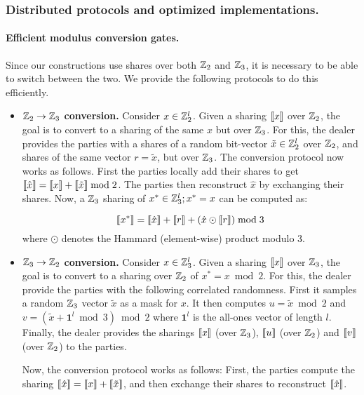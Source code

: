 \subsubsection{Distributed protocols and optimized implementations.}
 
 
\paragraph{Efficient modulus conversion gates.}
Since our constructions use shares over both $\mathbb{Z}_2$ and $\mathbb{Z}_3$, it is necessary to be able to switch between the two. We provide the following protocols to do this efficiently. 

\begin{itemize}
    \item \textbf{$\mathbb{Z}_2 \to \mathbb{Z}_3$ conversion.} Consider $x \in \mathbb{Z}_2^l$. Given a sharing $\left\llbracket x \right\rrbracket$ over $\mathbb{Z}_2$, the goal is to convert to a sharing of the same $x$ but over $\mathbb{Z}_3$. For this, the dealer provides the parties with a shares of a random bit-vector $\tilde{x} \in \mathbb{Z}_2^l$ over $\mathbb{Z}_2$, and shares of the same vector $r = \tilde{x}$, but over $\mathbb{Z}_3$. The conversion protocol now works as follows. First the parties locally add their shares to get $\left\llbracket \hat{x} \right\rrbracket = \left\llbracket x \right\rrbracket + \left\llbracket \tilde{x} \right\rrbracket \bmod 2$. The parties then reconstruct $\hat{x}$ by exchanging their shares. Now, a $\mathbb{Z}_3$ sharing of $x^* \in \mathbb{Z}_3^l; x^* = x$ can be computed as:

    \[
        \left\llbracket x^* \right\rrbracket = \left\llbracket \hat{x} \right\rrbracket + \left\llbracket r \right\rrbracket + (\hat{x} \odot \left\llbracket r \right\rrbracket) \bmod 3
    \]
    where $\odot$ denotes the Hammard (element-wise) product modulo 3.

    \item \textbf{$\mathbb{Z}_3 \to \mathbb{Z}_2$ conversion.}
    Consider $x \in \mathbb{Z}_3^l$. Given a sharing $\left\llbracket x \right\rrbracket$ over $\mathbb{Z}_3$, the goal is to convert to a sharing over $\mathbb{Z}_2$ of $x^* = x \bmod 2$. For this, the dealer provide the parties with the following correlated randomness. First it samples a random $\mathbb{Z}_3$ vector $\tilde{x}$ as a mask for $x$. It then computes $u = \tilde{x} \bmod 2$ and $v = (\tilde{x} + \textbf{1}^l \bmod 3) \bmod 2$ where $\textbf{1}^l$ is the all-ones vector of length $l$. Finally, the dealer provides the sharings $\left\llbracket x \right\rrbracket$ (over $\mathbb{Z}_3$), $\left\llbracket u \right\rrbracket$ (over $\mathbb{Z}_2$) and $\left\llbracket v \right\rrbracket$ (over $\mathbb{Z}_2$) to the parties.

    \hspace*{1em} Now, the conversion protocol works as follows: First, the parties compute the sharing $\left\llbracket \hat{x} \right\rrbracket = \left\llbracket x \right\rrbracket + \left\llbracket \tilde{x} \right\rrbracket$, and then exchange their shares to reconstruct $\left\llbracket \hat{x} \right\rrbracket$.

\end{itemize}

